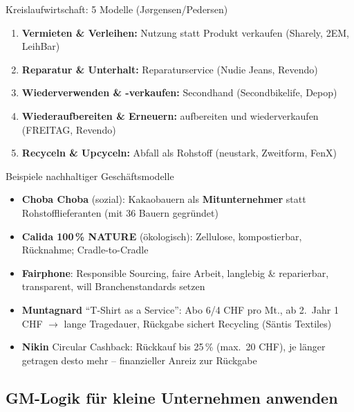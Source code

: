 \documentclass[a4paper, fontsize=7pt]{scrartcl}
\begin{document}
\begin{mainbox}{Kreislaufwirtschaft: 5 Modelle (Jørgensen/Pedersen)}
\begin{enumerate}
    \item \textbf{Vermieten \& Verleihen:} Nutzung statt Produkt verkaufen
    (Sharely, 2EM, LeihBar)
    \item \textbf{Reparatur \& Unterhalt:} Reparaturservice (Nudie Jeans,
    Revendo)
    \item \textbf{Wiederverwenden \& -verkaufen:} Secondhand
    (Secondbikelife, Depop)
    \item \textbf{Wiederaufbereiten \& Erneuern:} aufbereiten und
    wiederverkaufen (FREITAG, Revendo)
    \item \textbf{Recyceln \& Upcyceln:} Abfall als Rohstoff (neustark,
    Zweitform, FenX)
\end{enumerate}
\end{mainbox}

\begin{subbox}{Beispiele nachhaltiger Geschäftsmodelle}
\begin{itemize}
    \item \textbf{Choba Choba} (sozial): Kakaobauern als
    \textbf{Mitunternehmer} statt Rohstofflieferanten (mit 36 Bauern
    gegründet)
    \item \textbf{Calida 100\,\% NATURE} (ökologisch): Zellulose,
    kompostierbar, Rücknahme; Cradle-to-Cradle
    \item \textbf{Fairphone}: Responsible Sourcing, faire Arbeit, langlebig
    \& reparierbar, transparent, will Branchenstandards setzen
    \item \textbf{Muntagnard} ``T-Shirt as a Service'': Abo 6/4 CHF
    pro Mt., ab 2.\ Jahr 1 CHF $\to$ lange Tragedauer, Rückgabe sichert
    Recycling (Säntis Textiles)
    \item \textbf{Nikin} Circular Cashback: Rückkauf bis 25\,\% (max.\ 20
    CHF), je länger getragen desto mehr -- finanzieller Anreiz zur Rückgabe
\end{itemize}
\end{subbox}

\subsection{GM-Logik für kleine Unternehmen anwenden}
\end{document}

